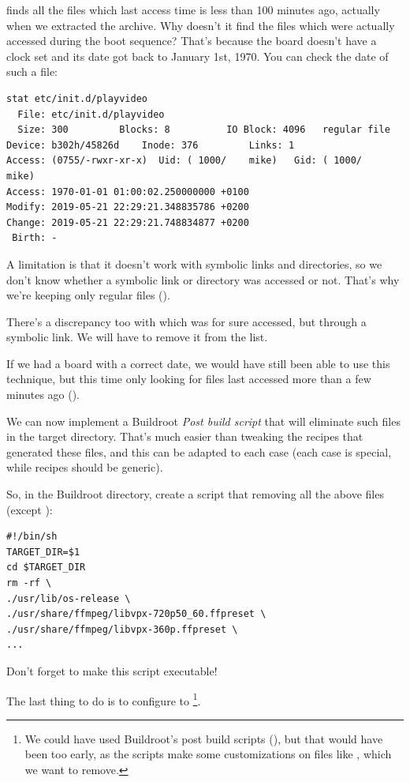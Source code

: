  finds all the files which last access time is
less than 100 minutes ago, actually when we extracted the archive.
Why doesn't it find the files which were actually accessed during the
boot sequence? That's because the board doesn't have a clock set and its
date got back to January 1st, 1970. You can check the date of such a
file:

\begin{verbatim}
stat etc/init.d/playvideo
  File: etc/init.d/playvideo
  Size: 300       	Blocks: 8          IO Block: 4096   regular file
Device: b302h/45826d	Inode: 376         Links: 1
Access: (0755/-rwxr-xr-x)  Uid: ( 1000/    mike)   Gid: ( 1000/    mike)
Access: 1970-01-01 01:00:02.250000000 +0100
Modify: 2019-05-21 22:29:21.348835786 +0200
Change: 2019-05-21 22:29:21.748834877 +0200
 Birth: -
\end{verbatim}

A limitation is that it doesn't work with symbolic links and directories, so we don't
know whether a symbolic link or directory was accessed or not. That's why we're
keeping only regular files ().

There's a discrepancy too with  which was for sure
accessed, but through a symbolic link. We will have to remove it from
the list.

If we had a board with a correct date, we would have still been able to
use this technique, but this time only looking for files last accessed more
than a few minutes ago ().

We can now implement a Buildroot {\em Post build script} that will
eliminate such files in the target directory. That's much easier than
tweaking the recipes that generated these files, and this can be adapted
to each case (each case is special, while recipes should be generic).

So, in the Buildroot directory, create a
 script that removing all the above
files (except ):

\begin{verbatim}
#!/bin/sh
TARGET_DIR=$1
cd $TARGET_DIR
rm -rf \
./usr/lib/os-release \
./usr/share/ffmpeg/libvpx-720p50_60.ffpreset \
./usr/share/ffmpeg/libvpx-360p.ffpreset \
...
\end{verbatim}

Don't forget to make this script executable!

The last thing to do is to configure 
to \footnote{We could have used
Buildroot's post build scripts (),
but that would have been too early, as the  scripts make
some customizations on files like \code{/etc/inittab}, which we want
to remove.}.

